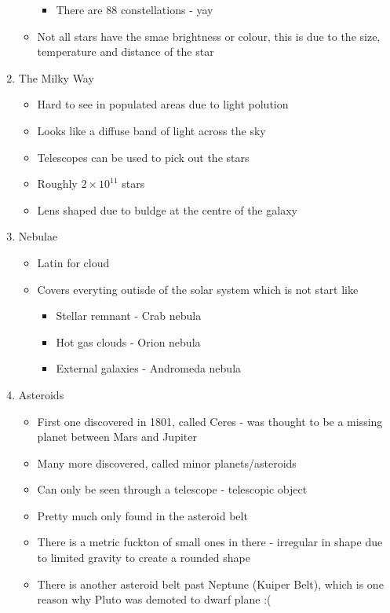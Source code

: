 \documentclass[a4paper, 11pt]{article}
\begin{document}
\begin{enumerate}
\begin{itemize}
\begin{itemize}
		\item There are 88 constellations - yay
		\end{itemize}
	\item Not all stars have the smae brightness or colour, this is due to the size, temperature and distance of the star
	\end{itemize}
\item The Milky Way
	\begin{itemize}
	\item Hard to see in populated areas due to light polution
	\item Looks like a diffuse band of light across the sky
	\item Telescopes can be used to pick out the stars
	\item Roughly \(2\times10^{11}\) stars
	\item Lens shaped due to buldge at the centre of the galaxy
	\end{itemize}
\item Nebulae
	\begin{itemize}
	\item Latin for cloud
	\item Covers everyting outisde of the solar system which is not start like
		\begin{itemize}
		\item Stellar remnant - Crab nebula
		\item Hot gas clouds - Orion nebula
		\item External galaxies - Andromeda nebula
		\end{itemize}
	\end{itemize}
\item Asteroids
	\begin{itemize}
	\item First one discovered in 1801, called Ceres - was thought to be a missing planet between Mars and Jupiter
	\item Many more discovered, called minor planets/asteroids
	\item Can only be seen through a telescope - telescopic object
	\item Pretty much only found in the asteroid belt
	\item There is a metric fuckton of small ones in there - irregular in shape due to limited gravity to create a rounded shape
	\item There is another asteroid belt past Neptune (Kuiper Belt), which is one reason why Pluto was demoted to dwarf plane :(
	\end{itemize}

\end{enumerate}
\end{document}
